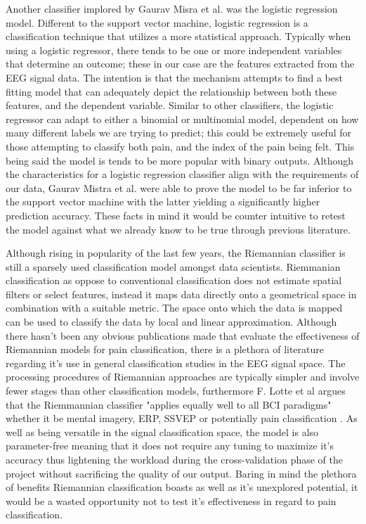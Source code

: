 \documentclass[12pt]{article}
\begin{document}
Another classifier implored by Gaurav Misra et al. was the logistic regression model. Different to the support vector machine, logistic regression is a classification technique that utilizes a more statistical approach. Typically when using a logistic regressor, there tends to be one or more independent variables that determine an outcome; these in our case are the features extracted from the EEG signal data. The intention is that the mechanism attempts to find a best fitting model that can adequately depict the relationship between both these features, and the dependent variable. Similar to other classifiers, the logistic regressor can adapt to either a binomial or multinomial model, dependent on how many different labels we are trying to predict; this could be extremely useful for those attempting to classify both pain, and the index of the pain being felt. This being said the model is tends to be more popular with binary outputs. Although the characteristics for a logistic regression classifier align with the requirements of our data, Gaurav Mistra et al. were able to prove the model to be far inferior to the support vector machine with the latter yielding a significantly higher prediction accuracy. These facts in mind it would be counter intuitive to retest the model against what we already know to be true through previous literature.

Although rising in popularity of the last few years, the Riemannian classifier is still a sparsely used classification model amongst data scientists. Riemmanian classification as oppose to conventional classification does not estimate spatial filters or select features, instead it maps data directly onto a geometrical space in combination with a suitable metric. The space onto which the data is mapped can be used to classify the data by local and linear approximation. Although there hasn't been any obvious publications made that evaluate the effectiveness of Riemannian models for pain classification, there is a plethora of literature regarding it's use in general classification studies in the EEG signal space. The processing procedures of Riemannian approaches are typically simpler and involve fewer stages than other classification models, furthermore F. Lotte et al argues that the Riemmannian classifier "applies equally well to all BCI paradigms" whether it be mental imagery, ERP, SSVEP or potentially pain classification \cite{Lotte2018-ex}. As well as being versatile in the signal classification space, the model is also parameter-free meaning that it does not require any tuning to maximize it's accuracy thus lightening the workload during the cross-validation phase of the project without sacrificing the quality of our output. Baring in mind the plethora of benefits Riemannian classification boasts as well as it's unexplored potential, it would be a wasted opportunity not to test it's effectiveness in regard to pain classification.
\end{document}
